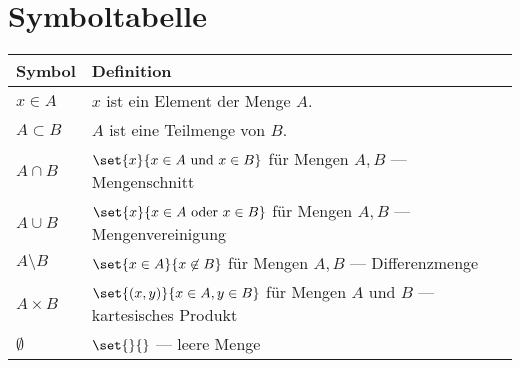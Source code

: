\documentclass[crop=false,10pt,ngerman]{standalone}
\begin{document}
	\section*{Symboltabelle}
	\renewcommand{\arraystretch}{1.3}
	\begin{table}[H]
		\scriptsize
		\begin{tabularx}{\textwidth}{p{}p{}}
			\hline
			\textbf{Symbol} & \textbf{Definition} \\
			\hline
			\hline

			$x\in A$ & $x$ ist ein Element der Menge $A$. \\

			$A\subset B$ & $A$ ist eine Teilmenge von $B$. \\

			$A\cap B$ & $\set{x}{x\in A \text{ und } x\in B}$ für Mengen $A,B$ --- Mengenschnitt \\

			$A\cup B$ & $\set{x}{x\in A \text{ oder } x\in B}$ für Mengen $A,B$ --- Mengenvereinigung \\

			$A\setminus B$ & $\set{x\in A}{x\not\in B}$ für Mengen $A,B$ --- Differenzmenge \\

			$A\times B$ & $\set{(x,y)}{x\in A,y\in B}$ für Mengen $A$ und $B$ --- kartesisches Produkt \\

			$\emptyset$ & $\set{}{}$ --- leere Menge \\


\end{tabularx}
\end{table}
\end{document}

